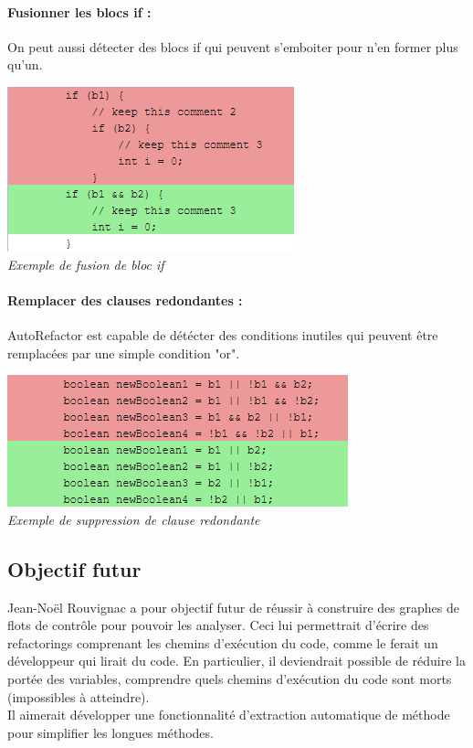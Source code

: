 \documentclass[a4paper,twoside,12pt,openright]{report}
\begin{document}
\paragraph{Fusionner les blocs if :}
On peut aussi détecter des blocs if qui peuvent s'emboiter pour n'en former plus qu'un.

\begin{center}
\includegraphics[scale=1]{Image/FusionIf.png}\\
\itshape{Exemple de fusion de bloc if \cite{ref10}}
\end{center}

\paragraph{Remplacer des clauses redondantes :}
AutoRefactor est capable de détécter des conditions inutiles qui peuvent être remplacées par une simple condition "or".

\begin{center}
\includegraphics[scale=1]{Image/ClauseRedondante.png}\\
\itshape{Exemple de suppression de clause redondante\cite{ref10}}
\end{center}


\subsection{Objectif futur}
Jean-Noël Rouvignac a pour objectif futur de réussir à construire des graphes de flots de contrôle pour pouvoir les analyser. Ceci lui permettrait d'écrire des refactorings comprenant les chemins d'exécution du code, comme le ferait un développeur qui lirait du code. En particulier, il deviendrait possible de réduire la portée des variables, comprendre quels chemins d'exécution du code sont morts (impossibles à atteindre).\cite{ref7}\\
Il aimerait développer une fonctionnalité d'extraction automatique de méthode pour simplifier les longues méthodes.\\
\end{document}
